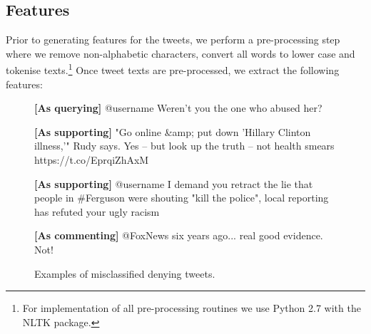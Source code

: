 \documentclass[11pt,a4paper]{article}
\begin{document}
\subsection{Features}
\label{sect:feat} 
Prior to generating features for the tweets, we perform a pre-processing step where we remove non-alphabetic characters, convert all words to lower case and tokenise texts.\footnote{For implementation of all pre-processing routines we use Python 2.7 with the NLTK package.} Once tweet texts are pre-processed, we extract the following features:
\begin{figure}
\begin{framed}
  
      \textbf{[As querying]} @username Weren't you the one who abused her? \vspace{0.15cm}
      
      \textbf{[As supporting]} "Go online \&amp; put down 'Hillary Clinton illness,'" Rudy says. Yes -- but look up the truth -- not health smears  https://t.co/EprqiZhAxM \vspace{0.15cm}
      
     \textbf{[As supporting]} @username I demand you retract the lie that people in \#Ferguson were shouting "kill the police", local reporting has refuted your ugly racism \vspace{0.15cm}
     
     \textbf{[As commenting]} @FoxNews six years ago... real good evidence.  Not! 
  
  \end{framed}
  \caption{Examples of misclassified denying tweets. } \vspace{-0.2cm}
  \label{fig:deny}
 \end{figure} 
\end{document}
